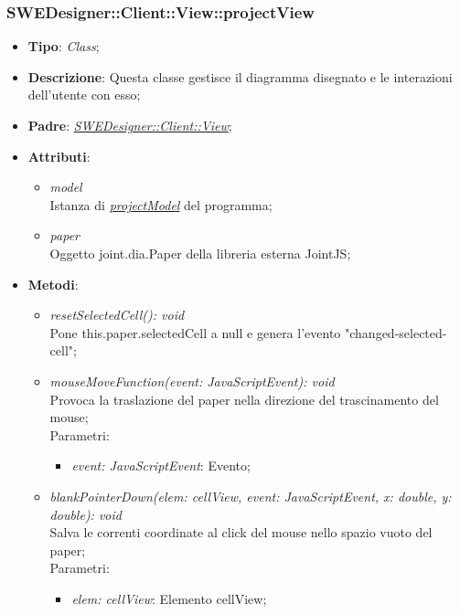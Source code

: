 \documentclass[../DefinizioneDiProdotto.tex]{subfiles}
\begin{document}
				\subsubsection{SWEDesigner::Client::View::projectView}
					\hypertarget{SWEDesigner::Client::View::projectView}{}
						\begin{itemize}
						\item \textbf{Tipo}: \emph{Class};
						\item \textbf{Descrizione}: Questa classe gestisce il diagramma disegnato e le interazioni dell'utente con esso;
						\item \textbf{Padre}: \hyperlink{SWEDesigner::Client::View}{\emph{SWEDesigner::Client::View}};
						\item \textbf{Attributi}:
						\begin{itemize}
							\item \emph{model} \\
							Istanza di \hyperlink{SWEDesigner::Model::projectModel}{\emph{projectModel}} del programma;
							\item \emph{paper} \\
							Oggetto joint.dia.Paper della libreria esterna JointJS;
						\end{itemize}
						\item \textbf{Metodi}:
						\begin{itemize}
							\item \emph{resetSelectedCell(): void} \\
							Pone this.paper.selectedCell a null e genera l'evento "changed-selected-cell";
							\item \emph{mouseMoveFunction(event: JavaScriptEvent): void} \\
							Provoca la traslazione del paper nella direzione del trascinamento del mouse; \\
							Parametri:
							\begin{itemize}
								\item \emph{event: JavaScriptEvent}: Evento;
							\end{itemize}
							\item \emph{blankPointerDown(elem: cellView, event: JavaScriptEvent, x: double, y: double): void} \\
							Salva le correnti coordinate al click del mouse nello spazio vuoto del paper; \\
							Parametri:
							\begin{itemize}
								\item \emph{elem: cellView}: Elemento cellView;

\end{itemize}
\end{itemize}
\end{itemize}
\end{document}
